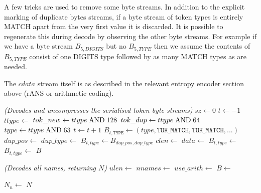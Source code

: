\documentclass[a4paper]{article}
\begin{document}
A few tricks are used to remove some byte streams.  In addition to the explicit marking of duplicate bytes streams, if a byte stream of token types is entirely MATCH apart from the very first value it is discarded.  It is possible to regenerate this during decode by observing the other byte streams.  For example if we have a byte stream $B_{5,DIGITS}$ but no $B_{5,TYPE}$ then we assume the contents of $B_{5,TYPE}$ consist of one DIGITS type followed by as many MATCH types as are needed.

The $cdata$ stream itself is as described in the relevant entropy encoder section above (rANS or arithmetic coding).

\begin{algorithmic}[1]
\Statex
\Statex \textit{(Decodes and uncompresses the serialised token byte streams)}
  \State $sz \gets 0$
  \State $t \gets -1$
  \Repeat
    \State $ttype \gets$ 
    \State $tok\_new \gets ttype \bitand 128$
    \State $tok\_dup \gets ttype \bitand 64$
    \State $type \gets ttype \bitand 63$
      \State $t \gets t+1$
        \State $B_{t,\texttt{TYPE}} \gets (type, \texttt{TOK\_MATCH}, \texttt{TOK\_MATCH}, ...)$
      \EndIf
    \EndIf
    \Statex
       \State $dup\_pos \gets$ 
       \State $dup\_type \gets$ 
       \State $B_{t,type} \gets B_{dup\_pos,dup\_type}$
    \Else
      \State $clen \gets$ 
      \State $data \gets$ 
        \State $B_{t,type} \gets$ 
      \Else
        \State $B_{t,type} \gets$ 
      \EndIf
    \EndIf
  \State \Return $B$
\EndFunction
\end{algorithmic}

\begin{algorithmic}[1]
\Statex
\Statex \textit{(Decodes all names, returning $N$)}
  \State $ulen \gets$ 
  \State $nnames \gets$ 
  \State $use\_arith \gets$ 
  \State $B \gets$ 

    \State $N_n \gets$ 
  \EndFor
  \State \Return $N$
\EndFunction
\end{algorithmic}
\end{document}
